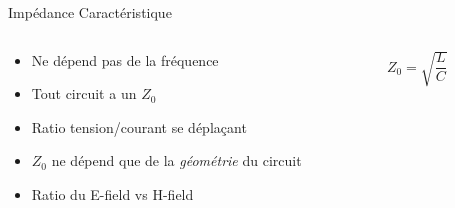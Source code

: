 \begin{frame}{Impédance Caractéristique}
    \begin{columns}
        \begin{column}{0.5\textwidth}
            \begin{itemize}
                \item Ne dépend pas de la fréquence
                \item Tout circuit a un $Z_0$
                \item Ratio tension/courant se déplaçant
                \bigskip
                \item $Z_0$ ne dépend que de la \textit{géométrie} du circuit
                \item Ratio du E-field vs H-field
            \end{itemize}
        \end{column}
        \begin{column}{0.5\textwidth}
            \begin{center}
                \huge{$Z_0 = \sqrt{\dfrac{L}{C}}$}\\
                \vspace{30pt}
            \end{center}
        \end{column}
    \end{columns}
\end{frame}

